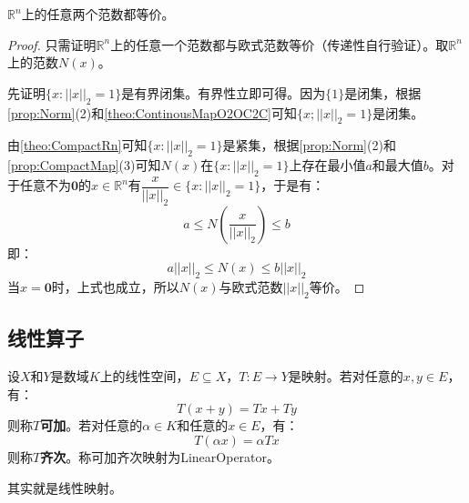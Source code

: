 \begin{theorem}\label{theo:NormRn}
	$\mathbb{R}^{n}$上的任意两个范数都等价。
\end{theorem}
\begin{proof}
	只需证明$\mathbb{R}^{n}$上的任意一个范数都与欧式范数等价（传递性自行验证）。取$\mathbb{R}^{n}$上的范数$N(x)$。\par
	先证明$\{x:||x||_2=1\}$是有界闭集。有界性立即可得。因为$\{1\}$是闭集，根据\cref{prop:Norm}(2)和\cref{theo:ContinousMapO2OC2C}可知$\{x;||x||_2=1\}$是闭集。\par
	由\cref{theo:CompactRn}可知$\{x:||x||_2=1\}$是紧集，根据\cref{prop:Norm}(2)和\cref{prop:CompactMap}(3)可知$N(x)$在$\{x:||x||_2=1\}$上存在最小值$a$和最大值$b$。对于任意不为$\mathbf{0}$的$x\in\mathbb{R}^{n}$有$\dfrac{x}{||x||_2}\in\{x:||x||_2=1\}$，于是有：
	\begin{equation*}
		a\leqslant N\left(\frac{x}{||x||_2}\right)\leqslant b
	\end{equation*}
	即：
	\begin{equation*}
		a||x||_2\leqslant N(x)\leqslant b||x||_2
	\end{equation*}
	当$x=\mathbf{0}$时，上式也成立，所以$N(x)$与欧式范数$||x||_2$等价。
\end{proof}

\subsection{线性算子}
\begin{definition}
	设$X$和$Y$是数域$K$上的线性空间，$E\subseteq X$，$T:E\to Y$是映射。若对任意的$x,y\in E$，有：
	\begin{equation*}
		T(x+y)=Tx+Ty
	\end{equation*}
	则称$T$\textbf{可加}。若对任意的$\alpha\in K$和任意的$x\in E$，有：
	\begin{equation*}
		T(\alpha x)=\alpha Tx
	\end{equation*}
	则称$T$\textbf{齐次}。称可加齐次映射为\gls{LinearOperator}。
\end{definition}
\begin{note}
	其实就是线性映射。
\end{note}
